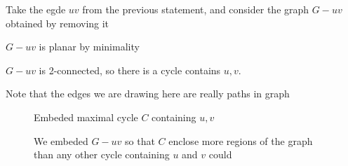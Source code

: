 Take the egde $uv$ from the previous statement, and consider the graph $G-uv$ obtained by removing it

$G-uv$ is planar by minimality

$G-uv$ is 2-connected, so there is a cycle contains $u,v$.

\begin{remark}
    Note that the edges we are drawing here are really paths in graph
\end{remark}

\begin{figure}[H]
    \begin{minipage}{0.4\textwidth}
    \end{minipage}
    \hfill
    \begin{minipage}{0.5\textwidth}
        Embeded maximal cycle $C$ containing $u,v$
    \end{minipage}

\end{figure}

\begin{figure}[H]
    \begin{minipage}{0.4\textwidth}
    \end{minipage}
    \hfill
    \begin{minipage}{0.5\textwidth}
        We embeded $G -uv$ so that $C$ enclose more regions of the graph than any other cycle containing $u$ and $v$ could
    \end{minipage}

\end{figure}

